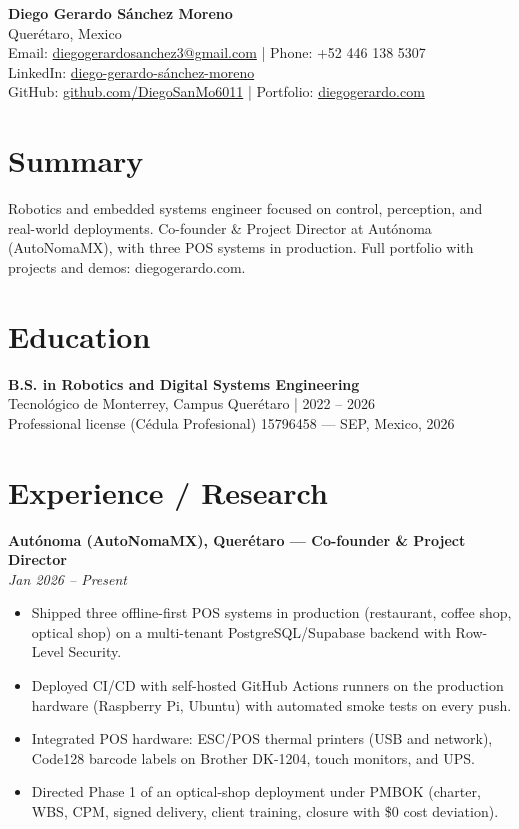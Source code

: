 \documentclass[9pt,letterpaper]{article}
\begin{document}
\thispagestyle{empty}

{\Huge\bfseries Diego Gerardo Sánchez Moreno}\\
\small Querétaro, Mexico \\
\small Email: \href{mailto:diegogerardosanchez3@gmail.com}{diegogerardosanchez3@gmail.com} \;|\; Phone: +52 446 138 5307\\
\small LinkedIn: \href{https://www.linkedin.com/in/diego-gerardo-sánchez-moreno-73549a296}{diego-gerardo-sánchez-moreno}\\
\small GitHub: \href{https://github.com/DiegoSanMo6011}{github.com/DiegoSanMo6011} \;|\; Portfolio: \href{https://diegogerardo.com}{diegogerardo.com}

\section*{Summary}
Robotics and embedded systems engineer focused on control, perception, and real-world deployments. Co-founder \& Project Director at Autónoma (AutoNomaMX), with three POS systems in production. Full portfolio with projects and demos: diegogerardo.com.

\section*{Education}
\textbf{B.S. in Robotics and Digital Systems Engineering}\\
Tecnológico de Monterrey, Campus Querétaro | 2022 -- 2026\\
Professional license (Cédula Profesional) 15796458 — SEP, Mexico, 2026

\section*{Experience / Research}
\textbf{Autónoma (AutoNomaMX), Querétaro — Co-founder \& Project Director}\\
\textit{Jan 2026 -- Present}
\begin{itemize}[leftmargin=*]
  \item Shipped three offline-first POS systems in production (restaurant, coffee shop, optical shop) on a multi-tenant PostgreSQL/Supabase backend with Row-Level Security.
  \item Deployed CI/CD with self-hosted GitHub Actions runners on the production hardware (Raspberry Pi, Ubuntu) with automated smoke tests on every push.
  \item Integrated POS hardware: ESC/POS thermal printers (USB and network), Code128 barcode labels on Brother DK-1204, touch monitors, and UPS.
  \item Directed Phase 1 of an optical-shop deployment under PMBOK (charter, WBS, CPM, signed delivery, client training, closure with \$0 cost deviation).
\end{itemize}
\end{document}
